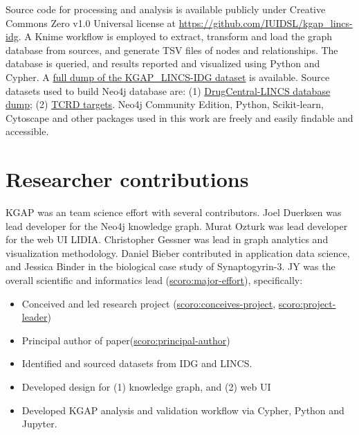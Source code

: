 Source code for processing and analysis is available publicly under Creative Commons Zero v1.0 Universal license at  \href{https://github.com/IUIDSL/kgap\_lincs-idg}{https://github.com/IUIDSL/kgap\_lincs-idg}. A Knime workflow is employed to extract, transform and load the graph database from sources, and generate TSV files of nodes and relationships. The database is queried, and results reported and visualized using Python and Cypher. A \href{https://cheminfov.informatics.indiana.edu/projects/kgap/data/dclneodb.dump}{full dump of the KGAP\_LINCS-IDG dataset} is available. Source datasets used to build Neo4j database are: (1) \href{https://cheminfov.informatics.indiana.edu/projects/kgap/data/drugcentral\_lincs.pgdump}{DrugCentral-LINCS database dump}; (2) \href{https://cheminfov.informatics.indiana.edu/projects/kgap/data/tcrd\_targets.tsv.gz}{TCRD targets}. Neo4j Community Edition, Python, Scikit-learn, Cytoscape and other packages used in this work are freely and easily findable and accessible.

\section{Researcher contributions}

KGAP was an team science effort with several contributors. Joel Duerksen was lead developer for the Neo4j knowledge graph. Murat Ozturk was lead developer for the web UI LIDIA. Christopher Gessner was lead in graph analytics  and visualization methodology. Daniel Bieber contributed in application data science, and Jessica Binder in the biological case study of Synaptogyrin-3. JY was the overall scientific and informatics lead (\href{http://purl.org/spar/scoro/major-effort}{scoro:major-effort}), specifically:

\begin{itemize}[topsep=0pt,itemsep=0pt,partopsep=0pt,parsep=0pt]
    \item Conceived and led research project (\href{http://purl.org/spar/scoro/conceives-project}{scoro:conceives-project}, \href{http://purl.org/spar/scoro/project-leader}{scoro:project-leader})
    \item Principal author of paper(\href{http://purl.org/spar/scoro/principal-author}{scoro:principal-author})
    \item Identified and sourced datasets from IDG and LINCS.
    \item Developed design for (1) knowledge graph, and (2) web UI
    \item Developed KGAP analysis and validation workflow via Cypher, Python and Jupyter. 
\end{itemize}


